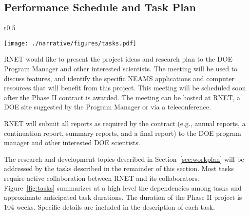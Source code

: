 


\subsection{Performance Schedule and Task Plan}
\label{sec:taskplan}

\begin{wrapfigure}{r}{0.5\linewidth}%
\begin{center}
\leavevmode
\texttt{[image: ./narrative/figures/tasks.pdf]}
\end{center}
\caption{Overview of task dependencies and timeline.}
\label{fig:tasks}
\end{wrapfigure}

RNET would like to present the project ideas and research plan to the
DOE Program Manager and other interested scientists. The meeting will
be used to discuss features, and identify the specific NEAMS applications and computer
resources that will benefit from this project.  This meeting will be
scheduled soon after the Phase II contract is awarded. The meeting can
be hosted at RNET, a DOE site suggested by the Program Manager or via
a teleconference.

RNET will submit all reports as required by the contract (e.g., annual reports, 
a continuation report, summary reports, and a final report) to the DOE program 
manager and other interested DOE scientists.

The research and development topics described in Section~\ref{sec:workplan} 
will be addressed by the tasks described in the remainder of this section. Most 
tasks require active collaboration between RNET and its collaborators. 
Figure~\ref{fig:tasks} summarizes at a high level the dependencies among tasks  and
approximate anticipated task durations. The duration of the Phase II 
project is 104 weeks. Specific details are included in the description of each 
task.



